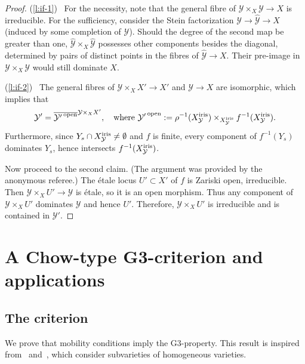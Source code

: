 \documentclass[10pt,a4paper]{article}
\numberwithin{equation}{section}
\theoremstyle{definition}
\theoremstyle{remark}
\let\cal\mathcal
\newcommand{\iris}{{\rm iris}}
\newcommand{\cY}{{\cal Y}}
\newcommand{\XX}{X}
\newcommand{\YY}{Y}
\newcommand{\open}{\mathrm{open}}
\begin{document}
\begin{proof} 
(\ref{l:if-1})~ For the necessity, note that the general fibre of $\cY\times_\XX\cY\to\XX$ is irreducible. For the sufficiency, consider the Stein factorization $\cY\to\hat\cY\to\XX$ (induced by some completion of $\cY$). Should the degree of the second map be greater than one, $\hat\cY\times_\XX\hat\cY$ possesses other components besides the diagonal, determined by pairs of distinct points in the fibres of $\hat\cY\to\XX$. Their pre-image in $\cY\times_\XX\cY$ would still dominate $\XX$.

(\ref{l:if-2})~ The general fibres of $\cY\times_\XX\XX'\to\XX'$ and $\cY\to\XX$ are isomorphic, which implies that 
\[
\cY'=\overline{{\cY'}^{\,\open}}^{\cY\times_\XX\XX'},\quad\text{where } {\cY'}^{\,\open}:=\rho^{-1}(\XX^\iris_\cY)\times_{\XX^\iris_\cY}f^{-1}(\XX^\iris_\cY).
\]
Furthermore, since $\YY_s\cap\XX^\iris_\cY\neq\emptyset$ and $f$ is finite, every component of $f^{-1}(\YY_s)$ dominates $\YY_s$, hence intersects $f^{-1}(\XX^\iris_\cY)$. 

Now proceed to the second claim. (The argument was provided by the anonymous referee.) The \'etale locus $U'\subset\XX'$ of $f$ is Zariski open, irreducible. Then $\cY\times_\XX U'\to \cY$ is \'etale, so it is an open morphism. Thus any component of $\cY\times_\XX U'$ dominates $\cY$ and hence $U'$. Therefore, $\cY\times_\XX U'$ is irreducible and is contained in $\cY'$.  
\end{proof}

\section{A Chow-type G3-criterion and applications}\label{sct:chow}

\subsection{The criterion} 
We prove that mobility conditions imply the G3-property. This result is inspired from~\cite{chow} and~\cite[Theorem 13.4]{bad}, which consider subvarieties of homogeneous varieties.
\end{document}
